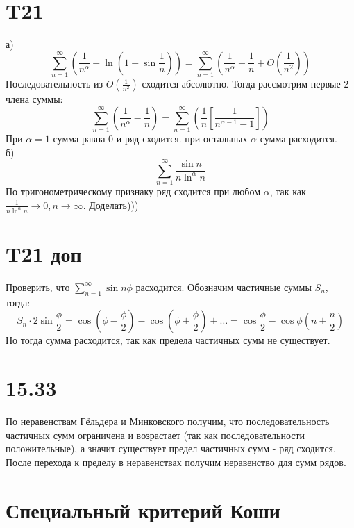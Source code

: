\documentclass[12pt]{article}
\begin{document}
\section{T21}
а)
\[
    \sum_{n=1}^{\infty} \left( \frac{1}{n^\alpha } - \ln (1 + \sin \frac{1}{n}) \right) = \sum_{n=1}^{\infty} \left( \frac{1}{n^\alpha} - \frac{1}{n} + O(\frac{1}{n^{2}}) \right) 
\]
Последовательность из $O(\frac{1}{n^2})$ сходится абсолютно. Тогда рассмотрим первые 2 члена суммы:
\[
    \sum_{n=1}^{\infty} \left( \frac{1}{n^\alpha } - \frac{1}{n} \right) = 
    \sum_{n=1}^{\infty} \left( \frac{1}{n} \left[\frac{1}{n^{\alpha-1} - 1}\right] \right) 
\] 
При $\alpha = 1$ сумма равна $0$ и ряд сходится.
при остальных $\alpha $ сумма расходится.
\\
б)
\[
    \sum_{n=1}^{\infty} \frac{\sin n}{n \ln^\alpha n}
\]
По тригонометрическому признаку ряд сходится при любом $\alpha$, так как $\frac{1}{n \ln ^\alpha n} \to 0, n \to \infty $. 
Доделать)))
\section{T21 доп}
Проверить, что $\sum_{n=1}^{\infty} \sin n\phi$ расходится.
Обозначим частичные суммы $S_n$, тогда: 
\[
    S_n \cdot 2\sin \frac{\phi}{2} = \cos \left( \phi - \frac{\phi}{2} \right)  
    - \cos \left( \phi + \frac{\phi}{2} \right) + \dots = \cos \frac{\phi}{2} - \cos  \phi \left( n + \frac{n}{2} \right) 
\]  
Но тогда сумма расходится, так как предела частичных сумм не существует.
\section{15.33}
По неравенствам Гёльдера и Минковского получим, что последовательность частичных сумм ограничена и возрастает (так как 
последовательности положительные), а значит существует предел частичных сумм - ряд сходится. После перехода к пределу в неравенствах получим неравенство для сумм рядов.
\section{Специальный критерий Коши}
\end{document}
